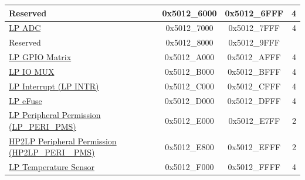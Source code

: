 \begin{ThreePartTable}
\begin{longtable}[c]{ |p{7cm}|c|c|r| }
\rowcolor{gray!25}  Reserved                      & 0x5012\_6000 & 0x5012\_6FFF &   4 \\\hline
\hyperref[mod:adc]{LP ADC}                        & 0x5012\_7000 & 0x5012\_7FFF &   4 \\\hline
\rowcolor{gray!25}  Reserved                      & 0x5012\_8000 & 0x5012\_9FFF &     \\\hline
\hyperref[mod:iomuxgpio]{LP GPIO Matrix}          & 0x5012\_A000 & 0x5012\_AFFF &   4 \\\hline
\hyperref[mod:iomuxgpio]{LP IO MUX}                & 0x5012\_B000 & 0x5012\_BFFF &   4 \\\hline
\hyperref[mod:ulp]{LP Interrupt (LP INTR)}        & 0x5012\_C000 & 0x5012\_CFFF &   4 \\\hline
\hyperref[mod:efuse]{LP eFuse}                    & 0x5012\_D000 & 0x5012\_DFFF &   4 \\\hline
\hyperref[mod:permctrl]{LP Peripheral Permission (LP\_PERI\_PMS)}                 & 0x5012\_E000 & 0x5012\_E7FF &   2 \\\hline
\hyperref[mod:permctrl]{HP2LP Peripheral Permission (HP2LP\_PERI\_ PMS)}            & 0x5012\_E800 & 0x5012\_EFFF &   2 \\\hline
\hyperref[mod:tmpsen]{LP Temperature Sensor}         & 0x5012\_F000 & 0x5012\_FFFF &   4 \\\hline
\end{longtable}
\end{ThreePartTable}
